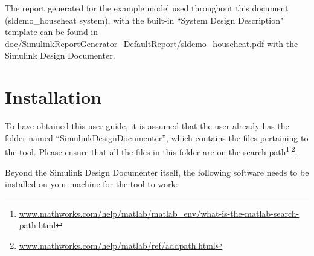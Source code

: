 \documentclass{mcscert}
\newcommand{\sddtool}{Simulink Design Documenter}
\begin{document}
The report generated for the example model used throughout this document (sldemo\_househeat system), with the built-in ``System Design Description" template can be found in doc/SimulinkReportGenerator\_DefaultReport/sldemo\_househeat.pdf with the \sddtool{}. %

\chapter{Installation} 
\label{ch:installation}
To have obtained this user guide, it is assumed that the user already has the folder named ``SimulinkDesignDocumenter'', which contains the files pertaining to the tool. 
Please ensure that all the files in this folder are on the \matlab{} search path\footnote{\href{https://www.mathworks.com/help/matlab/matlab\_env/what-is-the-matlab-search-path.html}{www.mathworks.com/help/matlab/matlab\_env/what-is-the-matlab-search-path.html}\label{matlab-search-path}}$^{,}$\footnote{\href{https://www.mathworks.com/help/matlab/ref/addpath.html}{www.mathworks.com/help/matlab/ref/addpath.html}\label{matlab-addpath}}.

Beyond the \sddtool{} itself, the following software needs to be installed on your machine for the tool to work:
\end{document}
